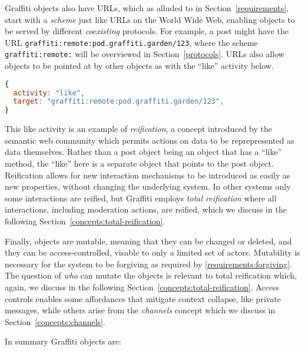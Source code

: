 Graffiti objects also have URLs, which
as alluded to in Section~\ref{requirements},
start with a \emph{scheme} just like URLs on the World Wide Web,
enabling objects to be served by different \emph{coexisting} protocols.
For example, a post might have the URL \texttt{graffiti:remote:pod.graffiti.garden/123},
where the scheme \texttt{graffiti:remote:} will be overviewed in Section~\ref{protocols}.
URLs also allow objects to be pointed at by other objects as with the
``like'' activity below.

\begin{lstlisting}[language=javascript]
{
  activity: "like",
  target: "graffiti:remote:pod.graffiti.garden/123",
}
\end{lstlisting}

This like activity is an example of \emph{reification},
a concept introduced by the semantic web community
which permits actions on data to be reprepresented as data themselves.
Rather than a post object being an object that has a ``like'' method,
the ``like'' here is a separate object that points to the post object.
Reification allows for new interaction mechanisms to be introduced as easily as new properties,
without changing the underlying system.
In other systems only some interactions are reified,
but Graffiti employs \emph{total reification} where
all interactions, including moderation actions, are reified,
which we discuss in the following
Section~\ref{concepts:total-reification}.


Finally, objects are mutable, meaning that they can be changed or deleted,
and they can be access-controlled, visable to only a limited set of actors.
Mutability is necessary for the system to be forgiving as required by \ref{requirements:forgiving}.
The question of \emph{who} can mutate the objects is relevant to
total reification which,
again, we discuss in the following
Section~\ref{concepts:total-reification}.
Access controls enables some affordances that mitigate context collapse,
like private messages, while others arise from the \emph{channels} concept
which we discuss in Section~\ref{concepts:channels}.

In summary Graffiti objects are:

